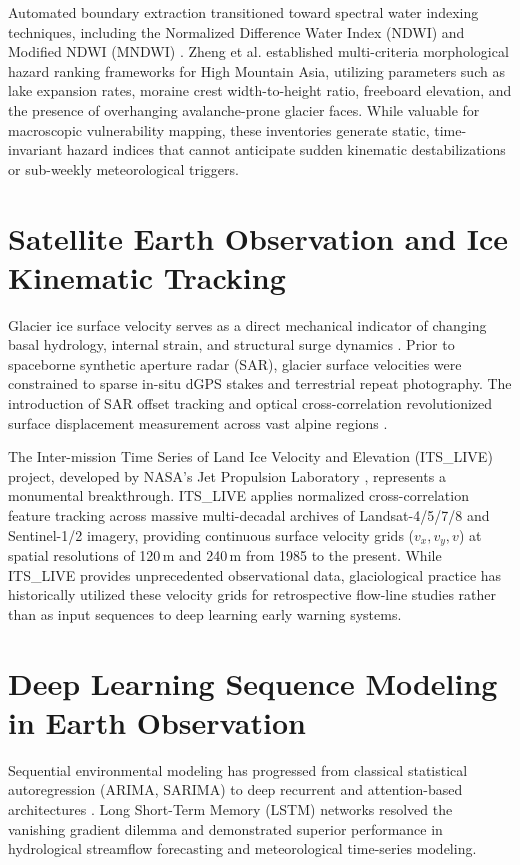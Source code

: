\documentclass{mnnit}
\begin{document}
Automated boundary extraction transitioned toward spectral water indexing techniques, including the Normalized Difference Water Index (NDWI) and Modified NDWI (MNDWI) \cite{pekel2016high, paul2015glacier}. Zheng et al. \cite{zheng2021assessment} established multi-criteria morphological hazard ranking frameworks for High Mountain Asia, utilizing parameters such as lake expansion rates, moraine crest width-to-height ratio, freeboard elevation, and the presence of overhanging avalanche-prone glacier faces. While valuable for macroscopic vulnerability mapping, these inventories generate static, time-invariant hazard indices that cannot anticipate sudden kinematic destabilizations or sub-weekly meteorological triggers.

\section{Satellite Earth Observation and Ice Kinematic Tracking}
Glacier ice surface velocity serves as a direct mechanical indicator of changing basal hydrology, internal strain, and structural surge dynamics \cite{fahnestock2016rapid}. Prior to spaceborne synthetic aperture radar (SAR), glacier surface velocities were constrained to sparse in-situ dGPS stakes and terrestrial repeat photography. The introduction of SAR offset tracking and optical cross-correlation revolutionized surface displacement measurement across vast alpine regions \cite{kaab2018glacier}.

The Inter-mission Time Series of Land Ice Velocity and Elevation (ITS\_LIVE) project, developed by NASA's Jet Propulsion Laboratory \cite{gardner2018itslive}, represents a monumental breakthrough. ITS\_LIVE applies normalized cross-correlation feature tracking across massive multi-decadal archives of Landsat-4/5/7/8 and Sentinel-1/2 imagery, providing continuous surface velocity grids ($v_x, v_y, v$) at spatial resolutions of 120\,m and 240\,m from 1985 to the present. While ITS\_LIVE provides unprecedented observational data, glaciological practice has historically utilized these velocity grids for retrospective flow-line studies rather than as input sequences to deep learning early warning systems.

\section{Deep Learning Sequence Modeling in Earth Observation}
Sequential environmental modeling has progressed from classical statistical autoregression (ARIMA, SARIMA) to deep recurrent and attention-based architectures \cite{hochreiter1997lstm}. Long Short-Term Memory (LSTM) networks resolved the vanishing gradient dilemma and demonstrated superior performance in hydrological streamflow forecasting and meteorological time-series modeling.
\end{document}
